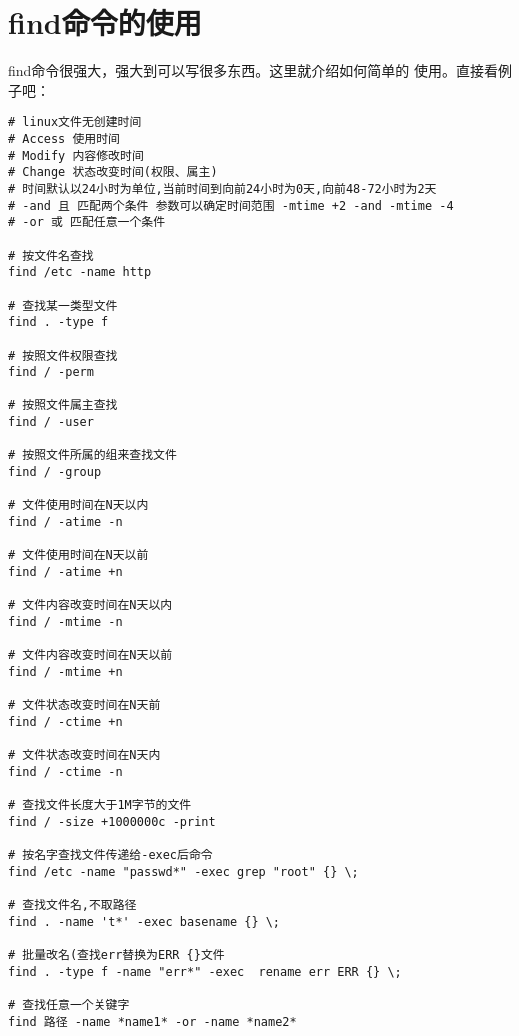 \section{find命令的使用}

find命令很强大，强大到可以写很多东西。这里就介绍如何简单的
使用。直接看例子吧：

\small{
\begin{verbatim}
# linux文件无创建时间
# Access 使用时间  
# Modify 内容修改时间  
# Change 状态改变时间(权限、属主)
# 时间默认以24小时为单位,当前时间到向前24小时为0天,向前48-72小时为2天
# -and 且 匹配两个条件 参数可以确定时间范围 -mtime +2 -and -mtime -4
# -or 或 匹配任意一个条件

# 按文件名查找
find /etc -name http        

# 查找某一类型文件
find . -type f               

# 按照文件权限查找
find / -perm                 

# 按照文件属主查找
find / -user                 

# 按照文件所属的组来查找文件
find / -group                

# 文件使用时间在N天以内
find / -atime -n             

# 文件使用时间在N天以前
find / -atime +n             

# 文件内容改变时间在N天以内
find / -mtime -n             

# 文件内容改变时间在N天以前
find / -mtime +n             

# 文件状态改变时间在N天前
find / -ctime +n             

# 文件状态改变时间在N天内
find / -ctime -n             

# 查找文件长度大于1M字节的文件
find / -size +1000000c -print 

# 按名字查找文件传递给-exec后命令
find /etc -name "passwd*" -exec grep "root" {} \; 

# 查找文件名,不取路径
find . -name 't*' -exec basename {} \;  

# 批量改名(查找err替换为ERR {}文件
find . -type f -name "err*" -exec  rename err ERR {} \; 

# 查找任意一个关键字
find 路径 -name *name1* -or -name *name2* 
\end{verbatim}
}
\normalsize

